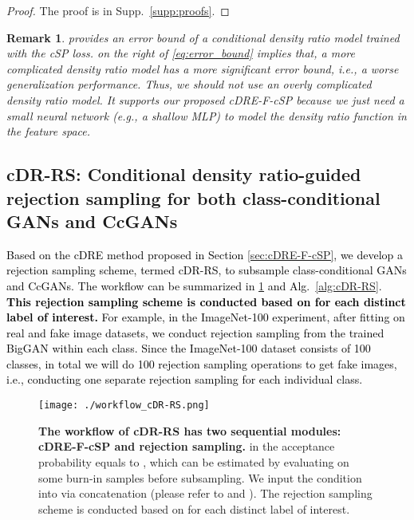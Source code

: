 \documentclass[final,12pt, 3p,times]{elsarticle}
\def\rev#1{\textcolor{black}{#1}}
\newtheorem{remark}{Remark}
\begin{document}
\begin{proof}
	The proof is in Supp.\ \ref{supp:proofs}.
\end{proof}


\begin{remark}
     provides an error bound of a conditional density ratio model trained with the cSP loss.   on the right of \cref{eq:error_bound} implies that, a more complicated density ratio model has a more significant error bound, i.e., a worse generalization performance. Thus, we should not use an overly complicated density ratio model. It supports our proposed cDRE-F-cSP because we just need a small neural network (e.g., a shallow MLP) to model the density ratio function in the feature space.
\end{remark}




\subsection{cDR-RS: Conditional density ratio-guided rejection sampling for both class-conditional GANs and CcGANs}\label{sec:cDR-RS}

\rev{Based on the cDRE method proposed in Section \ref{sec:cDRE-F-cSP}, we develop a rejection sampling scheme, termed cDR-RS, to subsample class-conditional GANs and CcGANs. The workflow can be summarized in \cref{fig:workflow_cDR-RS} and Alg.\ \ref{alg:cDR-RS}. \textbf{This rejection sampling scheme is conducted based on  for each distinct label  of interest.} For example, in the ImageNet-100 \cite{cao2017hashnet} experiment, after fitting  on real and fake image datasets, we conduct rejection sampling from the trained BigGAN within each class. Since the ImageNet-100 dataset consists of 100 classes, in total we will do 100 rejection sampling operations to get fake images, i.e., conducting one separate rejection sampling for each individual class. }







\begin{figure}[h]
	\centering
	\texttt{[image: ./workflow\_cDR-RS.png]}  \caption{\textbf{The workflow of cDR-RS has two sequential modules: cDRE-F-cSP and rejection sampling.}  in the acceptance probability  equals to , which can be estimated by evaluating  on some burn-in samples before subsampling. We input the condition  into  via concatenation (please refer to  and ). The rejection sampling scheme is conducted based on  for each distinct label  of interest.}
	\label{fig:workflow_cDR-RS}
\end{figure}
\end{document}
